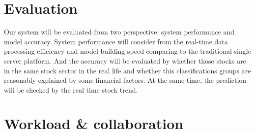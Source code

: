 \documentclass{vgtc}                          %
\begin{document}
\section{Evaluation}
\noindent Our system will be evaluated from two perspective: system performance and model accuracy. System performance will consider from the real-time data processing efficiency and model building speed comparing to the traditional single server platform. And the accuracy will be evaluated by whether those stocks are in the same stock sector in the real life and whether this classifications groups are reasonably explained by some financial factors. At the same time, the prediction will be checked by the real time stock trend.

\section{Workload \& collaboration}
\end{document}
